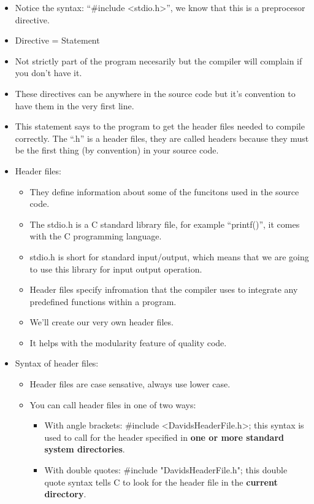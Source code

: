 \begin{itemize}
    \item Notice the syntax: ``\#include <stdio.h>'', we know that this is a preprocesor directive.
    \item Directive = Statement
    \item Not strictly part of the program necesarily but the compiler will complain if you don't have it.
    \item These directives can be anywhere in the source code but it's convention to have them in the very first line.
    \item This statement says to the program to get the header files needed to compile correctly. The ``.h'' is a header files, they are called headers because they must be the first thing (by convention) in your source code.
    \item Header files:
        \begin{itemize}
            \item They define information about some of the funcitons used in the source code.
            \item The stdio.h is a C standard library file, for example ``printf()'', it comes with the C programming language.
            \item stdio.h is short for standard input/output, which means that we are going to use this library for input output operation.
            \item Header files specify infromation that the compiler uses to integrate any predefined functions within a program.
            \item We'll create our very own header files.
            \item It helps with the modularity feature of quality code.
        \end{itemize}
    
    \item Syntax of header files:
        \begin{itemize}
            \item Header files are case sensative, always use lower case.
            \item You can call header files in one of two ways:
                \begin{itemize}
                    \item With angle brackets: \#include <DavidsHeaderFile.h>; this syntax is used to call for the header specified in \textbf{one or more standard system directories}.
                    \item With double quotes: \#include "DavidsHeaderFile.h"; this double quote syntax tells C to look for the header file in the \textbf{current directory}.
                \end{itemize}
            

\end{itemize}
\end{itemize}
